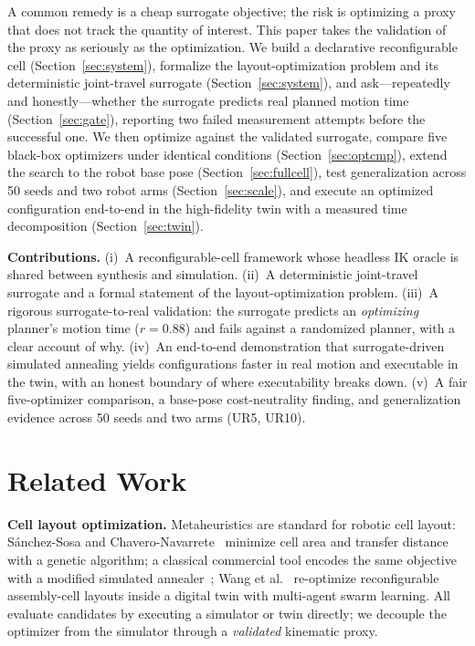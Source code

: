 \documentclass[conference]{IEEEtran}
\begin{document}
A common remedy is a cheap surrogate objective; the risk is optimizing a proxy that does not
track the quantity of interest. This paper takes the validation of the proxy as seriously as the
optimization. We build a declarative reconfigurable cell (Section~\ref{sec:system}), formalize
the layout-optimization problem and its deterministic joint-travel surrogate
(Section~\ref{sec:system}), and ask---repeatedly and honestly---whether the surrogate predicts
real planned motion time (Section~\ref{sec:gate}), reporting two failed measurement attempts
before the successful one. We then optimize against the validated surrogate, compare five
black-box optimizers under identical conditions (Section~\ref{sec:optcmp}), extend the search to
the robot base pose (Section~\ref{sec:fullcell}), test generalization across 50 seeds and two
robot arms (Section~\ref{sec:scale}), and execute an optimized configuration end-to-end in the
high-fidelity twin with a measured time decomposition (Section~\ref{sec:twin}).

\textbf{Contributions.} (i)~A reconfigurable-cell framework whose headless IK oracle is shared
between synthesis and simulation. (ii)~A deterministic joint-travel surrogate and a formal
statement of the layout-optimization problem. (iii)~A rigorous surrogate-to-real validation:
the surrogate predicts an \emph{optimizing} planner's motion time ($r=0.88$) and fails against a
randomized planner, with a clear account of why. (iv)~An end-to-end demonstration that
surrogate-driven simulated annealing yields configurations faster in real motion and executable
in the twin, with an honest boundary of where executability breaks down. (v)~A fair
five-optimizer comparison, a base-pose cost-neutrality finding, and generalization evidence
across 50 seeds and two arms (UR5, UR10).

\section{Related Work}
\label{sec:related}
\textbf{Cell layout optimization.} Metaheuristics are standard for robotic cell layout:
S\'anchez-Sosa and Chavero-Navarrete~\cite{sanchez} minimize cell area and transfer distance
with a genetic algorithm; a classical commercial tool encodes the same objective with a modified
simulated annealer~\cite{barral}; Wang et al.~\cite{wang} re-optimize reconfigurable
assembly-cell layouts inside a digital twin with multi-agent swarm learning. All evaluate
candidates by executing a simulator or twin directly; we decouple the optimizer from the
simulator through a \emph{validated} kinematic proxy.
\end{document}
